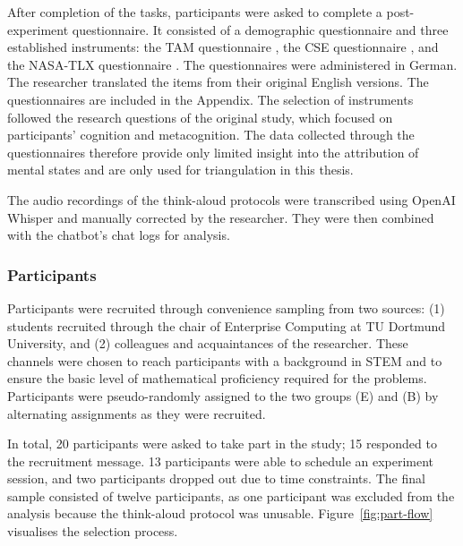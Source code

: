 After completion of the tasks, participants were asked to complete a post-experiment questionnaire. It consisted of a demographic questionnaire and three established instruments: the \ac{TAM} questionnaire \parencite{Davis1989}, the \ac{CSE} questionnaire \parencite{Compeau1995}, and the \acs{NASA}-\ac{TLX} questionnaire \parencite{Hart1988}. The questionnaires were administered in German. The researcher translated the items from their original English versions. The questionnaires are included in the Appendix. The selection of instruments followed the research questions of the original study, which focused on participants' cognition and metacognition. The data collected through the questionnaires therefore provide only limited insight into the attribution of mental states and are only used for triangulation in this thesis.

The audio recordings of the think-aloud protocols were transcribed using OpenAI Whisper \parencite{Radford2023} and manually corrected by the researcher. They were then combined with the chatbot's chat logs for analysis.

\subsubsection{Participants} \label{sssec:participants}

Participants were recruited through convenience sampling from two sources: (1) students recruited through the chair of Enterprise Computing at TU Dortmund University, and (2) colleagues and acquaintances of the researcher. These channels were chosen to reach participants with a background in \ac{STEM} and to ensure the basic level of mathematical proficiency required for the problems. Participants were pseudo-randomly assigned to the two groups (E) and (B) by alternating assignments as they were recruited.

In total, 20 participants were asked to take part in the study; 15 responded to the recruitment message. 13 participants were able to schedule an experiment session, and two participants dropped out due to time constraints. The final sample consisted of twelve participants, as one participant was excluded from the analysis because the think-aloud protocol was unusable. Figure~\ref{fig:part-flow} visualises the selection process.

